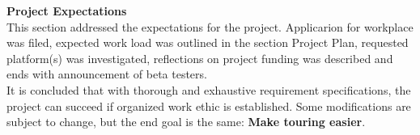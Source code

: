 \textbf{Project Expectations} \\
This section addressed the expectations for the project. Applicarion for workplace was filed, expected work load was outlined in the section Project Plan, requested platform(s) was investigated, reflections on project funding was described and ends with announcement of beta testers. \\

It is concluded that with thorough and exhaustive requirement specifications, the project can succeed if organized work ethic is established. Some modifications are subject to change, but the end goal is the same: \textbf{Make touring easier}.
